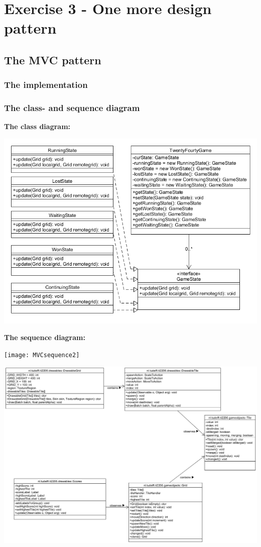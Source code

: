 \documentclass[a4paper,11pt,report]{scrartcl}
\begin{document}
\newpage\section{Exercise 3 - One more design pattern}
\subsection{The MVC pattern}
\subsubsection{The implementation}

\newpage\subsubsection{The class- and sequence diagram}
\textbf{The class diagram:}\\
\centerline{\includegraphics[scale=0.7]{statePatternUML}}

\newpage\textbf{The sequence diagram:}\\
\centerline{\texttt{[image: MVCsequence2]}}


\centerline{\includegraphics[scale=0.7]{mvcPattern}}
\end{document}
